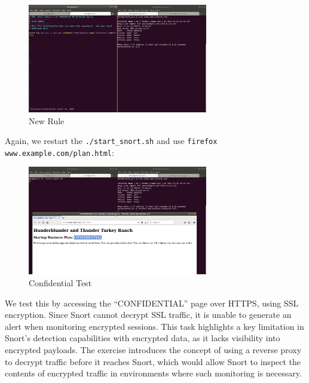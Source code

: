 \documentclass[a4paper,11pt]{article} %
\begin{document}
\begin{figure}[h!]
    \centering
    \includegraphics[width=0.7\textwidth]{images/20.png}
    \caption{New Rule}
\end{figure}
Again, we restart the \texttt{./start\_snort.sh} and use \texttt{firefox www.example.com/plan.html}:

\break

\begin{figure}[h!]
    \centering
    \includegraphics[width=0.7\textwidth]{images/21.png}
    \caption{Confidential Test}
\end{figure}

We test this by accessing the “CONFIDENTIAL” page over HTTPS, using SSL encryption. Since Snort cannot decrypt SSL traffic, it is unable to generate an alert when monitoring encrypted sessions. This task highlights a key limitation in Snort’s detection capabilities with encrypted data, as it lacks visibility into encrypted payloads. The exercise introduces the concept of using a reverse proxy to decrypt traffic before it reaches Snort, which would allow Snort to inspect the contents of encrypted traffic in environments where such monitoring is necessary.
\end{document}

